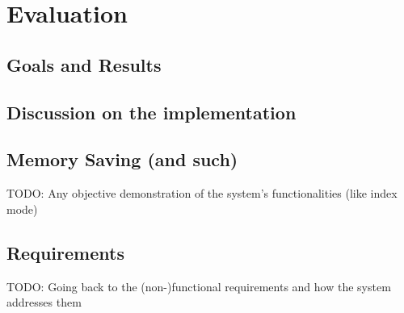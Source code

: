 \chapter{Evaluation}

\section{Goals and Results}

\section{Discussion on the implementation}

\section{Memory Saving (and such)}

TODO: Any objective demonstration of the system's functionalities (like index mode)

\section{Requirements}

TODO: Going back to the (non-)functional requirements and how the system addresses them